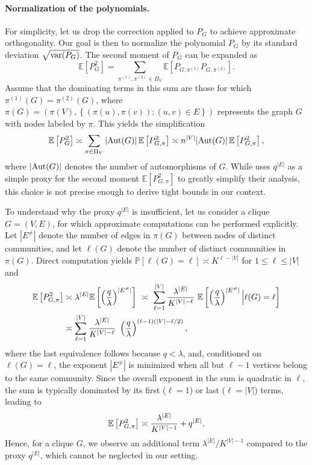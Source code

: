 \documentclass[final]{colt2026}
\newcommand{\1}{\mathbf{1}}
\newcommand{\bbE}{\mathbb{E}}
\newcommand{\bbP}{\mathbb{P}}
\newcommand{\pa}[1]{\left(#1\right)}
\newcommand{\ac}[1]{\left\{#1\right\}}
\newcommand{\cro}[1]{\left[#1\right]}
\begin{document}
\paragraph{Normalization of the polynomials.} 
For simplicity, let us drop the correction applied to $P_{G}$ to achieve approximate orthogonality. Our goal is then to normalize the polynomial $P_{G}$ by its standard deviation $\sqrt{{\rm var}(P_{G})}$. The second moment of $P_{G}$ can be expanded as
\begin{equation}\label{eq:moment1-init}
\bbE\cro{P_{G}^2}= \sum_{\pi^{(1)},\pi^{(2)}\in \Pi_{V}} \bbE\cro{P_{G,\pi^{(1)}}P_{G,\pi^{(2)}}}.
\end{equation}
Assume that the dominating terms in this sum are those for which $\pi^{(1)}(G)=\pi^{(2)}(G)$, where $\pi(G)=(\pi(V),\ac{(\pi(u),\pi(v)):(u,v)\in E})$ represents the graph $G$ with nodes labeled by $\pi$. This yields the simplification
\begin{equation}\label{eq:moment2-init}
\bbE\cro{P_{G}^2}\asymp \sum_{\pi \in \Pi_{V}} |{\rm Aut}(G)|\, \bbE\cro{P_{G,\pi}^2}\asymp n^{|V|} |{\rm Aut}(G)|\, \bbE\cro{P_{G,\pi}^2},
\end{equation}
where $|{\rm Aut}(G)|$ denotes the number of automorphisms of $G$. 
While \cite{CGGV25} uses $q^{|E|}$ as a simple proxy for the second moment $\bbE[P_{G,\pi}^2]$ to greatly simplify their analysis, this choice is not precise enough to derive tight bounds in our context.

To understand why the proxy $q^{|E|}$ is insufficient, let us consider a clique $G=(V,E)$, for which approximate computations can be performed explicitly. Let $|E^{\neq}|$ denote the number of edges in $\pi(G)$ between nodes of distinct communities, and let $\ell(G)$ denote the number of distinct communities in $\pi(G)$. Direct computation yields $\bbP[\ell(G)=\ell]\asymp K^{\ell-|V|}$ for $1\leq \ell\leq |V|$ and
\begin{align*}
\bbE\cro{P_{G,\pi}^2} &\asymp \lambda^{|E|} \bbE\cro{\pa{q\over \lambda}^{|E^{\neq}|}} \ \asymp \ \sum_{\ell=1}^{|V|} {\lambda^{|E|}\over K^{|V|-\ell}}\ \bbE\cro{\pa{q\over \lambda}^{|E^{\neq}|}\Big| \ell(G)=\ell}\\
&\asymp \sum_{\ell=1}^{|V|} {\lambda^{|E|}\over K^{|V|-\ell}}\ \pa{q\over \lambda}^{(\ell-1)(|V|-\ell/2)},
\end{align*}
where the last equivalence follows because $q<\lambda$, and, conditioned on $\ell(G)=\ell$, the exponent $|E^{\neq}|$ is minimized when all but $\ell-1$ vertices belong to the same community. Since the overall exponent in the sum is quadratic in $\ell$, the sum is typically dominated by its first ($\ell=1$) or last ($\ell=|V|$) terms, leading to
\begin{equation}\label{eq:moment3-init}
\bbE\cro{P_{G,\pi}^2} \asymp {\lambda^{|E|}\over K^{|V|-1}}+q^{|E|}.
\end{equation}
Hence, for a clique $G$, we observe an additional term $\lambda^{|E|}/ K^{|V|-1}$ compared to the proxy $q^{|E|}$, which cannot be neglected in our setting. 
\end{document}
